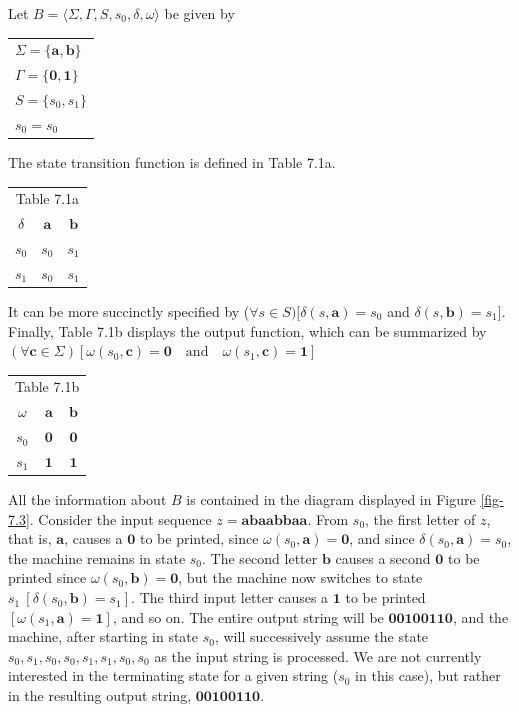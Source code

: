 Let $B=\langle\Sigma,\Gamma,S,s_0,\delta,\omega\rangle$ be given by
\begin{center}
\begin{tabular}{l}
$\Sigma =\{\pmb{a},\pmb{b}\}$ \\
$\Gamma=\{\pmb{0},\pmb{1}\}$ \\
$S = \{s_0,s_1\}$ \\
$s_0 = s_0$
\end{tabular}
\end{center}
The state transition function is defined in Table 7.1a.

\begin{table}[h]\label{tbl-7.1a}
\begin{center}
\begin{tabular}{c|cc}
\multicolumn{3}{c}{Table 7.1a} \\
$\delta$ & $\pmb{a}$ & $\pmb{b}$ \\
\hline
$s_0$ & $s_0$ & $s_1$ \\
$s_1$ & $s_0$ & $s_1$ \\
\end{tabular}
\end{center}
\end{table}
It can be more succinctly specified by ($\forall s \in S)[\delta(s,\pmb{a}) =
s_0$ and $\delta(s,\pmb{b}) = s_1]$. Finally, Table 7.1b displays the
output function, which can be summarized by
$ (\forall \pmb{c} \in \Sigma)[\omega(s_0,\pmb{c})=\pmb{0}\quad\text{and}\quad\omega(s_1,\pmb{c}) =
	\pmb{1}] $
\begin{table}[h]\label{tbl-7.1b}
\begin{center}\begin{tabular}{c|cc}
\multicolumn{3}{c}{Table 7.1b} \\
$\omega$ & $\pmb{a}$ & $\pmb{b}$ \\
\hline
$s_0$ & $\pmb{0}$ & $\pmb{0}$ \\
$s_1$ & $\pmb{1}$ & $\pmb{1}$
\end{tabular}\end{center}
\end{table}

All the information about $B$ is contained in the diagram displayed in Figure
\ref{fig-7.3}. Consider the input sequence $z=\pmb{abaabbaa}$. From $s_0$, the first
letter of $z$, that is, $\pmb{a}$, causes a $\pmb{0}$ to be printed, since
$\omega(s_0,\pmb{a}) = \pmb{0}$, and since $\delta(s_0,\pmb{a}) = s_0$, the
machine remains in state $s_0$. The second letter $\pmb{b}$ causes a second
$\pmb{0}$ to be printed since $\omega(s_0,\pmb{b}) =\pmb{0}$, but the machine
now switches to state $s_1\ [\delta(s_0,\pmb{b}) = s_1]$. The third input letter
causes a $\pmb{1}$ to be printed $[\omega(s_1,\pmb{a})=\pmb{1}]$, and so on. The
entire output string will be $\pmb{00100110}$, and the machine, after starting
in state $s_0$, will successively assume the state $s_0,s_1,s_0,s_0,s_1,s_1,s_0,
s_0$ as the input string is processed. We are not currently interested in the
terminating state for a given string ($s_0$ in this case), but rather in the
resulting output string, $\pmb{00100110}$.

